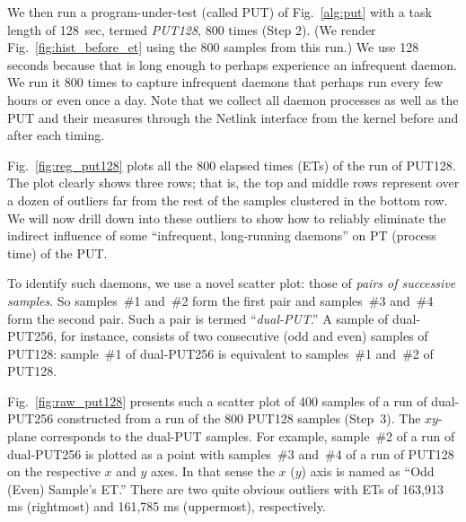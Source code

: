 \documentclass[letter]{ieice}
\begin{document}
{\color{blue}
We then run a program-under-test (called PUT) of 
Fig.~\ref{alg:put} with a task length of 128~sec, 
termed {\em PUT128}, 800 times (Step 2). 
(We render Fig.~\ref{fig:hist_before_et} using the 800 samples from this run.)
We use 128 seconds because that is long enough to perhaps experience an infrequent daemon. 
We run it 800 times to capture infrequent daemons that perhaps run every few hours or even 
once a day. 
Note that we collect all daemon processes as well as the PUT and their measures 
through the Netlink interface from the kernel before and after each 
timing.

Fig.~\ref{fig:reg_put128} plots all the 800 elapsed times (ETs) of the run of PUT128.
The plot clearly shows three rows; that is, 
the top and middle rows represent over a dozen of outliers far from 
the rest of the samples clustered in the bottom row. 
We will now drill down into these outliers to 
show how to reliably eliminate the indirect influence of 
some ``infrequent, \hbox{long-running} daemons'' on PT (\hbox{process} time) of the PUT.

To identify such daemons, we use a novel \hbox{scatter} plot: 
those of {\em pairs of successive samples}. 
So samples~\#{1} and~\#{2} form the first pair and samples~\#{3} and~\#{4} 
form the second pair.
Such a pair is termed ``\hbox{{\it dual-PUT}}.'' 
A sample of \hbox{dual-PUT256}, for instance, 
consists of two consecutive (odd and even) 
samples of PUT128: 
sample~\#{1} of dual-PUT256 is equivalent 
to samples~\#{1} and~\#{2} of PUT128.

Fig.~\ref{fig:raw_put128} presents such a scatter plot 
of 400 samples of a run of \hbox{dual-PUT256} constructed 
from a run of the 800 PUT128 samples (Step~3). 
The $xy$-plane corresponds to the dual-PUT samples. 
For example, \hbox{sample}~\#{2} of a run of dual-PUT256 
is plotted as a point with samples~\#{3} and~\#{4} of a run of PUT128 
on the respective $x$ and $y$ axes. In that sense 
the $x$ ($y$) axis is named as ``Odd (Even) Sample's ET.''
There are two quite obvious outliers with ETs 
of 163,913 ms (rightmost) and 161,785 ms (uppermost), respectively.

}
\end{document}
